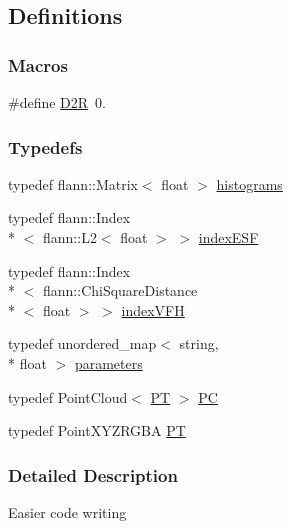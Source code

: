 \hypertarget{group__Definitions}{\subsection{Definitions}
\label{group__Definitions}
}
\subsubsection*{Macros}
\begin{DoxyCompactItemize}
\item 
\#define \hyperlink{group__Definitions_ga0a3cc1d5cde549e408f825ddd7f5853d}{D2\-R}~0.
\end{DoxyCompactItemize}
\subsubsection*{Typedefs}
\begin{DoxyCompactItemize}
\item 
typedef flann\-::\-Matrix$<$ float $>$ \hyperlink{group__Definitions_ga136493056b2eaf642f660e6a45a62991}{histograms}
\item 
typedef flann\-::\-Index\\*
$<$ flann\-::\-L2$<$ float $>$ $>$ \hyperlink{group__Definitions_ga3f45d3216269cf676ea864ae3bfcc446}{index\-E\-S\-F}
\item 
typedef flann\-::\-Index\\*
$<$ flann\-::\-Chi\-Square\-Distance\\*
$<$ float $>$ $>$ \hyperlink{group__Definitions_gacea1a4bf0f6b886a58ff00ff9cb54b34}{index\-V\-F\-H}
\item 
typedef unordered\-\_\-map$<$ string, \\*
float $>$ \hyperlink{group__Definitions_gacbb28d8f791bb363852e522cf3b83c47}{parameters}
\item 
typedef Point\-Cloud$<$ \hyperlink{group__Definitions_ga102df08e7bbccbe3fa6e0b53fd9bac74}{P\-T} $>$ \hyperlink{group__Definitions_ga62eb21fcfa3189c5de50fb62a2a7a79e}{P\-C}
\item 
typedef Point\-X\-Y\-Z\-R\-G\-B\-A \hyperlink{group__Definitions_ga102df08e7bbccbe3fa6e0b53fd9bac74}{P\-T}
\end{DoxyCompactItemize}


\subsubsection{Detailed Description}
Easier code writing 

